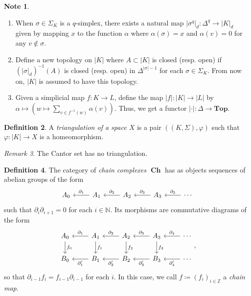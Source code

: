 \documentclass[10pt,letterpaper,cm]{nupset}
\theoremstyle{definition}
\newtheorem{definition}{Definition}[subsection]
\newtheorem{note}[definition]{Note}
\theoremstyle{theorem}
\theoremstyle{remark}
\newtheorem{remark}[definition]{Remark}
\newcommand{\N}{\mathbb N}
\newcommand{\Z}{\mathbb Z}
\newcommand{\1}{\mathbb{1}}
\newcommand{\0}{\vec 0}
\DeclareMathOperator{\ch}{\mathbf{Ch}}
\begin{document}
\begin{note} $ $
\begin{enumerate}
\item When $\sigma \in \Sigma_K$ is a $q$-simplex, there exists a natural map $|\sigma^q|_d : \Delta^q \to |K|_d$  given by mapping $x$ to the function $\alpha$ where $\alpha(\sigma) =x$ and $\alpha(v) = 0$ for any $v\notin \sigma$.  
\item Define a new topology on $|K|$ where $A\subset |K|$ is closed (resp. open) if $(|\sigma|_d)^{-1}(A)$ is closed (resp. open) in $\Delta^{|\sigma| -1}$ for each $\sigma \in \Sigma_K$. From now on, $|K|$ is assumed to have this topology. 
\item Given a simplicial map $f: K \to L$, define the map $|f| : |K| \to |L|$ by $\alpha \mapsto (w \mapsto \sum_{v\in f^{-1}(w)} \alpha(v))$. Thus, we get a functor $|\cdot | : \Delta \to \mathbf{Top}$.
\end{enumerate}
\end{note}

\begin{definition}
A \textit{triangulation of a space $X$} is a pair $((K, \Sigma), \varphi)$ such that $\varphi : |K| \to X$ is a homeomorphism. 
\end{definition}

\begin{remark}
The Cantor set has no triangulation. 
\end{remark}

\begin{definition}
The category of \textit{chain complexes $\ch$} has as objects sequences of abelian groups of the form 
\[
\begin{tikzcd}
A_0 & A_1 \arrow[l, "\partial_1"'] & A_2 \arrow[l, "\partial_2"'] & A_3 \arrow[l, "\partial_3"'] & \cdots \arrow[l, "\partial_3"']
\end{tikzcd}
\] such that $\partial_i\partial_{i+1} =0$ for each $i\in \N$. Its morphisms are commutative diagrams of the form
\[
\begin{tikzcd}
A_0 \arrow[d, "f_0"] & A_1 \arrow[l, "\partial_1"'] \arrow[d, "f_1"] & A_2 \arrow[l, "\partial_2"'] \arrow[d, "f_2"] & A_3 \arrow[l, "\partial_3"'] \arrow[d, "f_3"] & \cdots \arrow[l, "\partial_4"'] \\
B_0 & B_1 \arrow[l, "\partial'_1"] & B_2 \arrow[l, "\partial'_2"] & B_3 \arrow[l, "\partial'_3"] & \cdots \arrow[l, "\partial'_4"]
\end{tikzcd}
,\] so that  $\partial_{i-1}f_i = f_{i-1}\partial_{i-1}$ for each $i$. In this case, we call $f\coloneqq  (f_i)_{i\in \Z}$ a \textit{chain map}.
\end{definition}
\end{document}
